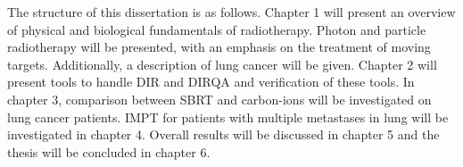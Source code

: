The structure of this dissertation is as follows. Chapter 1 will present an overview of physical and biological fundamentals of radiotherapy. 
Photon and particle radiotherapy will be presented, with an emphasis on the treatment of moving targets. Additionally, a description of lung cancer 
will be given. Chapter 2 will present tools to handle DIR and DIRQA and verification of these tools. In chapter 3, 
comparison between SBRT and carbon-ions will be investigated on lung cancer patients. 
IMPT for patients with multiple metastases in lung will be investigated in chapter 4. Overall results will be discussed in chapter 5 and the thesis will be concluded in chapter 6.

